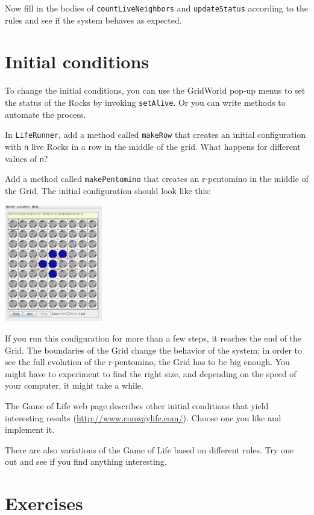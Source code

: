 Now fill in the bodies of {\tt countLiveNeighbors} and
{\tt updateStatus} according to the rules and see if the system behaves
as expected.


\section{Initial conditions}

To change the initial conditions, you can use the GridWorld pop-up
menus to set the status of the Rocks by invoking {\tt setAlive}.
Or you can write methods to automate the process.

In {\tt LifeRunner}, add a method called {\tt makeRow} that creates
an initial configuration with {\tt n} live Rocks in a row in the middle
of the grid.  What happens for different values of {\tt n}?

Add a method called {\tt makePentomino} that creates
an r-pentomino in the middle of the Grid.  The initial configuration
should look like this:

\includegraphics[height=2in]{figs/LifeRunner.pdf}

If you run this configuration for more than a few steps, it reaches the
end of the Grid.  The boundaries of the Grid change the behavior of
the system; in order to see the full evolution of the r-pentomino,
the Grid has to be big enough.  You might have to experiment to find
the right size, and depending on the speed of your computer, it
might take a while.

The Game of Life web page describes other initial conditions that
yield interesting results (\url{http://www.conwaylife.com/}).  Choose
one you like and implement it.

There are also variations of the Game of Life based on different rules.
Try one out and see if you find anything interesting.

\section{Exercises}

